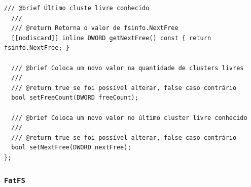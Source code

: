 \documentclass[
    12pt,				%
    oneside,   	        %
    a4paper,			%
    english,			%
    french,				%
    spanish,			%
    brazil,				%
    ]{pacotes/abntex2}
\begin{document}
\begin{lstlisting}[caption={Classe que abstrai a extração de informações da estrutura FSInfo}, label={lst:fileinfo}]
  /// @brief Último cluste livre conhecido
  ///
  /// @return Retorna o valor de fsinfo.NextFree
  [[nodiscard]] inline DWORD getNextFree() const { return fsinfo.NextFree; }

  /// @brief Coloca um novo valor na quantidade de clusters livres
  ///
  /// @return true se foi possível alterar, false caso contrário
  bool setFreeCount(DWORD freeCount);

  /// @brief Coloca um novo valor no último cluster livre conhecido
  ///
  /// @return true se foi possível alterar, false caso contrário
  bool setNextFree(DWORD nextFree);
};
\end{lstlisting}

\subsubsection{\texttt{FatFS}}
\label{subsubsec:file_sys_info}
\end{document}
